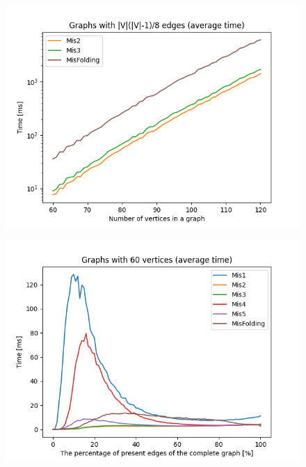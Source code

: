 \begin{figure}[H]
\includegraphics[width=\textwidth]{4_benchmark/plots/bign2.png}
\centering
\end{figure}

\begin{figure}[H]
\includegraphics[width=\textwidth]{4_benchmark/plots/edges.png}
\centering
\end{figure}

